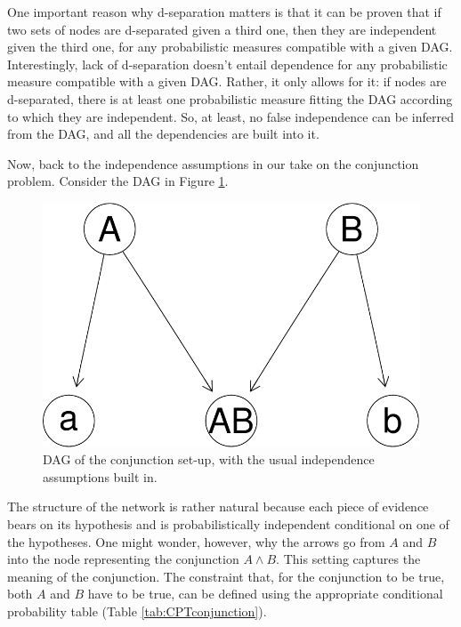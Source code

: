\documentclass[
  10pt,
  dvipsnames,enabledeprecatedfontcommands]{scrartcl}
\begin{document}
One important reason why d-separation matters is that it can be proven
that if two sets of nodes are d-separated given a third one, then they
are independent given the third one, for any probabilistic measures
compatible with a given DAG. Interestingly, lack of d-separation doesn't
entail dependence for any probabilistic measure compatible with a given
DAG. Rather, it only allows for it: if nodes are d-separated, there is
at least one probabilistic measure fitting the DAG according to which
they are independent. So, at least, no false independence can be
inferred from the DAG, and all the dependencies are built into it.

Now, back to the independence assumptions in our take on the conjunction
problem. Consider the DAG in Figure \ref{fig:conjunctionDAG}.

\begin{figure}[h]

\begin{center}\includegraphics[width=0.6\linewidth]{conjunction-paradox_files/figure-latex/fig:conjunctionDAG-1} \end{center}
\caption{DAG of the conjunction set-up, with the usual independence assumptions built in.}
\label{fig:conjunctionDAG}
\end{figure}

The structure of the network is rather natural because each piece of
evidence bears on its hypothesis and is probabilistically independent
conditional on one of the hypotheses. One might wonder, however, why the
arrows go from \(A\) and \(B\) into the node representing the
conjunction \(A\wedge B\). This setting captures the meaning of the
conjunction. The constraint that, for the conjunction to be true, both
\(A\) and \(B\) have to be true, can be defined using the appropriate
conditional probability table (Table \ref{tab:CPTconjunction}).
\end{document}
